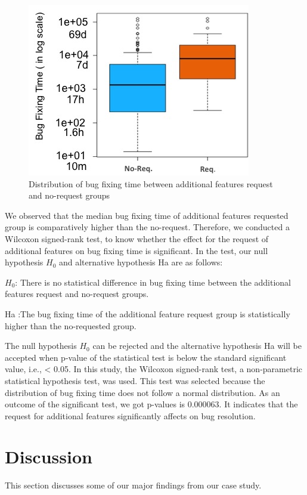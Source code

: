 \documentclass[conference]{IEEEtran}
\begin{document}
 \begin{figure}[t] %
  \begin{center}
    \includegraphics[width=.49\textwidth]{Images/BugFixingTime.jpg}
    \caption{\textsf{Distribution of bug fixing time between additional features request and no-request groups}}
    \label{fig:RQ2_IARvsnonR}
  \end{center}
  \end{figure}

We observed that the median bug fixing time of additional features requested group is comparatively higher than the no-request. Therefore, we conducted a Wilcoxon signed-rank test, to know whether the effect for the request of additional features on bug fixing time is significant. In the test, our null hypothesis $H_0$ and alternative hypothesis Ha are as follows:

$H_0$: There is no statistical difference in bug fixing time between the additional features request and no-request groups.

Ha :The bug fixing time of the additional feature request group is statistically higher than the no-requested group.

The null hypothesis $H_0$ can be rejected and the alternative hypothesis Ha will be accepted when p-value of the statistical test is below the standard significant value, i.e.,  < 0.05. In this study, the Wilcoxon signed-rank test, a non-parametric statistical hypothesis test, was used. This test was selected because the distribution of bug fixing time does not follow a normal distribution. As an outcome of the significant test, we got p-values is 0.000063. It indicates that the request for additional features significantly affects on bug resolution. 
\section{Discussion}
This section discusses some of our major findings from our case study.
 
\end{document}
